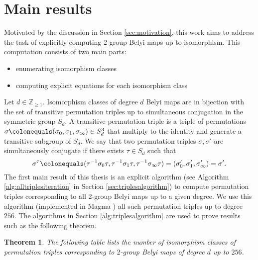 \documentclass{dcthesis}
\newcommand{\ZZ}{\mathbb Z}
\newcommand{\defi}[1]{\textsf{#1}}
\numberwithin{equation}{section}
\newtheorem{theorem}[equation]{Theorem}
\theoremstyle{definition}
\theoremstyle{remark}
\begin{document}
{{  \section{Main results}{\label{sec:mainresults}
    Motivated by the discussion in
    Section \ref{sec:motivation},
    this work aims to address the task
    of explicitly computing
    $2$-group Belyi maps up to isomorphism.
    This computation consists of two
    main parts:
    \begin{itemize}
      \item
        enumerating isomorphism classes
      \item
        computing explicit equations
        for each isomorphism class
    \end{itemize}
    \par
    Let $d\in\ZZ_{\geq 1}$.
    Isomorphism classes of degree $d$
    Belyi maps
    are in bijection with
    the set of
    transitive permutation triples
    up to
    simultaneous conjugation
    in the symmetric group $S_d$.
    A \defi{transitive permutation triple}
    is a triple of permutations
    $\sigma\colonequals
    (\sigma_0,\sigma_1,\sigma_\infty)
    \in S_d^3$
    that multiply to the identity
    and generate a transitive subgroup
    of $S_d$.
    We say
    that two permutation triples
    $\sigma,\sigma'$ are
    \defi{simultaneously conjugate}
    if there exists $\tau\in S_d$ such that
    \begin{equation}\label{eqn:simconj_results}
      \sigma^\tau \colonequals
      (\tau^{-1}\sigma_0\tau, \tau^{-1}\sigma_1\tau, \tau^{-1}\sigma_\infty\tau)
      = \left(\sigma'_0,\sigma'_1,\sigma'_\infty\right)
      = \sigma'.
    \end{equation}
    The first main result of this thesis
    is an explicit algorithm
    (see Algorithm
    \ref{alg:alltriplesiteration}
    in Section \ref{sec:triplesalgorithm})
    to compute permutation triples
    corresponding to all $2$-group Belyi
    maps up to a given degree.
    We use this algorithm (implemented in
    \textsf{Magma} \cite{magma})
    all such permutation triples up to
    degree $256$.
    The algorithms in Section
    \ref{alg:triplesalgorithm}
    are used to prove results such as
    the following theorem.
    \begin{theorem}\label{thm:isoclasses_results}
      The following table lists
      the number of isomorphism classes of
      permutation triples corresponding to
      $2$-group Belyi maps
      of degree $d$ up to $256$.
      \begin{equation}

\end{equation}
\end{theorem}}}}
\end{document}
